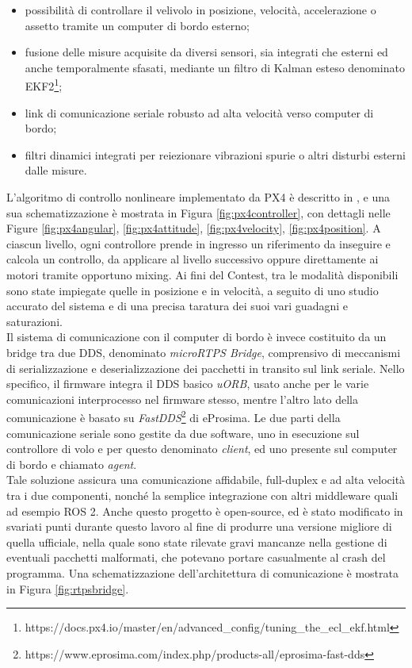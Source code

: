 \begin{itemize}
    \item possibilità di controllare il velivolo in posizione, velocità, accelerazione o assetto tramite un computer di bordo esterno;
    \item fusione delle misure acquisite da diversi sensori, sia integrati che esterni ed anche temporalmente sfasati, mediante un filtro di Kalman esteso denominato EKF2\footnote{https://docs.px4.io/master/en/advanced\_config/tuning\_the\_ecl\_ekf.html};
    \item link di comunicazione seriale robusto ad alta velocità verso computer di bordo;
    \item filtri dinamici integrati per reiezionare vibrazioni spurie o altri disturbi esterni dalle misure.
\end{itemize}
\vfill\newpage
L'algoritmo di controllo nonlineare implementato da PX4 è descritto in \cite{px4control}, e una sua schematizzazione è mostrata in Figura \ref{fig:px4controller}, con dettagli nelle Figure \ref{fig:px4angular}, \ref{fig:px4attitude}, \ref{fig:px4velocity}, \ref{fig:px4position}. A ciascun livello, ogni controllore prende in ingresso un riferimento da inseguire e calcola un controllo, da applicare al livello successivo oppure direttamente ai motori tramite opportuno mixing. Ai fini del Contest, tra le modalità disponibili sono state impiegate quelle in posizione e in velocità, a seguito di uno studio accurato del sistema e di una precisa taratura dei suoi vari guadagni e saturazioni.\\
Il sistema di comunicazione con il computer di bordo è invece costituito da un bridge tra due DDS, denominato \emph{microRTPS Bridge}, comprensivo di meccanismi di serializzazione e deserializzazione dei pacchetti in transito sul link seriale. Nello specifico, il firmware integra il DDS basico \emph{uORB}, usato anche per le varie comunicazioni interprocesso nel firmware stesso, mentre l'altro lato della comunicazione è basato su \emph{FastDDS}\footnote{https://www.eprosima.com/index.php/products-all/eprosima-fast-dds} di eProsima. Le due parti della comunicazione seriale sono gestite da due software, uno in esecuzione sul controllore di volo e per questo denominato \emph{client}, ed uno presente sul computer di bordo e chiamato \emph{agent}.\\
Tale soluzione assicura una comunicazione affidabile, full-duplex e ad alta velocità tra i due componenti, nonché la semplice integrazione con altri middleware quali ad esempio ROS 2. Anche questo progetto è open-source, ed è stato modificato in svariati punti durante questo lavoro al fine di produrre una versione migliore di quella ufficiale, nella quale sono state rilevate gravi mancanze nella gestione di eventuali pacchetti malformati, che potevano portare casualmente al crash del programma. Una schematizzazione dell'architettura di comunicazione è mostrata in Figura \ref{fig:rtpsbridge}.
\vfill\newpage

